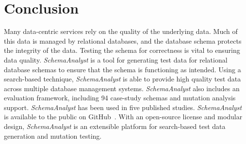 \section{Conclusion}\label{sec:conclusion}

Many data-centric services rely on the quality of the underlying data. Much of this data
is managed by relational databases, and the database schema protects the integrity of the data.
Testing the schema for correctness is vital to ensuring data quality. \textit{SchemaAnalyst} is a
tool for generating test data for relational database schemas to ensure that the schema is functioning 
as intended. Using a search-based technique, \textit{SchemaAnalyst} is able to provide high quality test
data across multiple database management systems. \textit{SchemaAnalyst} also includes an evaluation
framework, including 94 case-study schemas and mutation analysis support. \textit{SchemaAnalyst} has been
used in five published studies.
\textit{SchemaAnalyst} is available to the public on
GitHub~\cite{tool}. With an open-source license and modular design, \textit{SchemaAnalyst} is an extensible
platform for search-based test data generation and mutation testing.
